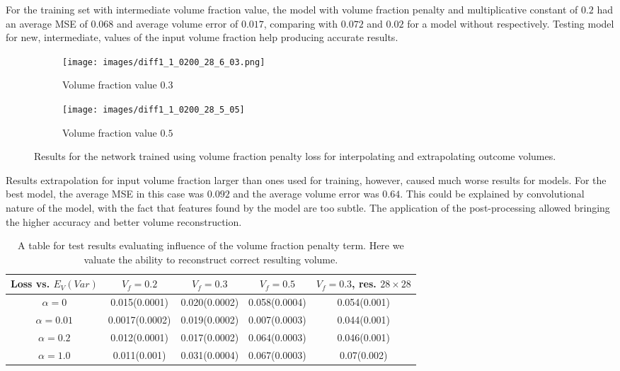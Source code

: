For the training set with intermediate volume fraction value, the model with volume fraction penalty and multiplicative constant of $0.2$ had an average MSE of $0.068$ and average volume error of $0.017$, comparing with $0.072$ and $0.02$ for a model without respectively.
Testing model for new, intermediate, values of the input volume fraction help producing accurate results.
\begin{figure}[H]
	\begin{subfigure}[b]{0.5\linewidth}
		\centering
		\texttt{[image: images/diff1\_1\_0200\_28\_6\_03.png]}
		\caption{Volume fraction value $0.3$}
		\label{fig:vf_example_1}
	\end{subfigure}
	\begin{subfigure}[b]{0.5\linewidth}
		\centering
		\texttt{[image: images/diff1\_1\_0200\_28\_5\_05]}
		\caption{Volume fraction value $0.5$ }
		\label{fig:vf_example_2}
	\end{subfigure}
 \caption{Results for the network trained using volume fraction penalty loss for interpolating and extrapolating outcome volumes.}
	\label{fig:vf_example}
\end{figure}
Results extrapolation for input volume fraction larger than ones used for training, however, caused much worse results for models. 
For the best model, the average MSE in this case was $0.092$ and the average volume error was $0.64$.
This could be explained by convolutional nature of the model, with the fact that features found by the model are too subtle.  
The application of the post-processing allowed bringing the higher accuracy and better volume reconstruction. 
\begin{table}[h]
	\begin{center}
		\begin{tabular}{ |c|c|c|c|c| }
			\hline
			Loss vs. $E_{V}(Var)$ & $V_f=0.2$ & $V_f=0.3$& $V_f=0.5$ &  $V_f=0.3$, res. $28\times 28$\\ 
			\hline
			$\alpha=0$ & 0.015(0.0001) & 0.020(0.0002) & 0.058(0.0004) & 0.054(0.001)  \\
			$\alpha=0.01$ & 0.0017(0.0002) & 0.019(0.0002) & 0.007(0.0003) & 0.044(0.001)\\
			$\alpha=0.2$ & 0.012(0.0001) & 0.017(0.0002)  & 0.064(0.0003)  & 0.046(0.001) \\
			$\alpha=1.0$ & 0.011(0.001) & 0.031(0.0004) & 0.067(0.0003) & 0.07(0.002) \\
			\hline
		\end{tabular}
	\end{center}
	\caption{A table for test results evaluating influence of the volume fraction penalty term. Here we valuate the ability to reconstruct correct resulting volume.}\label{tab:vf_full_vf}
\end{table}
\medskip 

